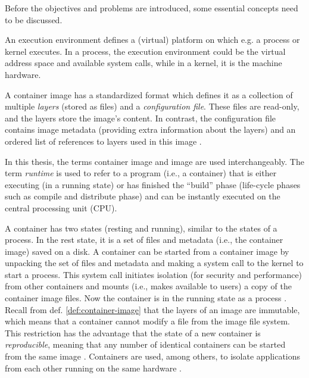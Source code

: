 Before the objectives and problems are introduced, some essential concepts need to be discussed.
\begin{Def}
  An execution environment defines a (virtual) platform on which e.g. a process or kernel executes.
  In a process, the execution environment could be the virtual address space and available system calls, while in a kernel, it is the machine hardware.
  \label{def:execution-environment}
\end{Def}
\begin{Def}
  \label{def:container-image}
  A container image has a standardized format which defines it as a collection of multiple \emph{layers} (stored as files) and a \emph{configuration file}. These files are read-only, and the layers store the image's content. In contrast, the configuration file contains image metadata (providing extra information about the layers) and an ordered list of references to layers used in this image \cite{redHatContainerTerms}\cite{BraunDockerLayers}.
\end{Def}
In this thesis, the terms container image and image are used interchangeably. The term \emph{runtime} is used to refer to a program (i.e., a container) that is either executing (in a running state) or has finished the ``build'' phase (life-cycle phases such as compile and distribute phase) and can be instantly executed on the central processing unit (CPU). \begin{Def}
  \label{def:container}
  A container has two states (resting and running), similar to the states of a process. In the rest state, it is a set of files and metadata (i.e., the container image) saved on a disk. A container can be started from a container image by unpacking the set of files and metadata and making a system call to the kernel to start a process. This system call initiates isolation (for security and performance) from other containers and mounts (i.e., makes available to users) a copy of the container image files. Now the container is in the running state as a process \cite{redHatContainerTerms}\cite{dockerOverview}. Recall from def. \ref{def:container-image} that the layers of an image are immutable, which means that a container cannot modify a file from the image file system. This restriction has the advantage that the state of a new container is \emph{reproducible}, meaning that any number of identical containers can be started from the same image \cite{BraunDockerLayers}\cite{DockerStorageDrivers}. Containers are used, among others, to isolate applications from each other running on the same hardware \cite{Mouat99117185791205503}.
\end{Def}
